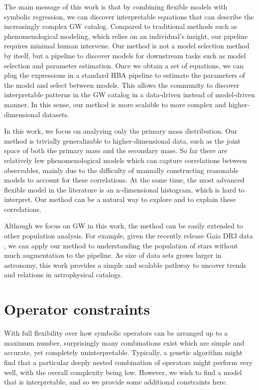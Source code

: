\documentclass[nohyperref]{article}
\theoremstyle{plain}
\theoremstyle{definition}
\theoremstyle{remark}
\begin{document}
The main message of this work is that by combining flexible models with symbolic regression, we can discover interpretable equations that can describe the increasingly complex GW catalog.
Compared to traditional methods such as phenomenological modeling, which relies on an individual's insight,
our pipeline requires minimal human intervene.
Our method is not a model selection method by itself, but a pipeline to discover models for downstream tasks such as model selection and parameter estimation.
Once we obtain a set of equations, we can plug the expressions in a standard HBA pipeline to estimate the parameters of the model and select between models.
This allows the community to discover interpretable patterns in the GW catalog in a data-driven instead of model-driven manner.
In this sense, our method is more scalable to more complex and higher-dimensional datasets.

In this work, we focus on analyzing only the primary mass distribution.
Our method is trivially generalizable to higher-dimensional data, such as the joint space of both the primary mass and the secondary mass.
So far there are relatively few phenomenological models which can capture correlations between observables,
mainly due to the difficulty of manually constructing reasonable models to account for these correlations.
At the same time, the most advanced flexible model in the literature is an n-dimensional histogram, which is hard to interpret.
Our method can be a natural way to explore and to explain these correlations.

Although we focus on GW in this work, the method can be easily extended to other population analysis.
For example, given the recently release Gaia DR3 data \cite{Collaboration2016TheGM}, we can apply our method to understanding the population of stars without much augmentation to the pipeline.
As size of data sets grows larger in astronomy, this work provides a simple and scalable pathway to uncover trends and relations in astrophysical catalogs.





\clearpage
\appendix
\section{Operator constraints}
\label{sec:constraints}

With full flexibility over how symbolic operators can be arranged up to a maximum number, surprisingly many combinations exist which are simple and accurate, yet completely uninterpretable.
Typically, a genetic algorithm might find that a particular deeply nested combination of operators might perform very well, with the overall complexity being low.
However, we wish to find a model that is interpretable, and so we provide some additional constraints here.
\end{document}
